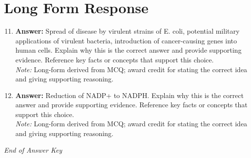 \documentclass[12pt]{article}
\begin{document}
\section*{Long Form Response}
\begin{enumerate}[label=\arabic*.]
\setcounter{enumi}{10}
\item \textbf{Answer:} Spread of disease by virulent strains of E. coli, potential military applications of virulent bacteria, introduction of cancer-causing genes into human cells. Explain why this is the correct answer and provide supporting evidence. Reference key facts or concepts that support this choice.
\\ \textit{Note:} Long-form derived from MCQ; award credit for stating the correct idea and giving supporting reasoning.
\item \textbf{Answer:} Reduction of NADP+ to NADPH. Explain why this is the correct answer and provide supporting evidence. Reference key facts or concepts that support this choice.
\\ \textit{Note:} Long-form derived from MCQ; award credit for stating the correct idea and giving supporting reasoning.
\end{enumerate}

\vfill
\noindent\textit{End of Answer Key}
\end{document}
